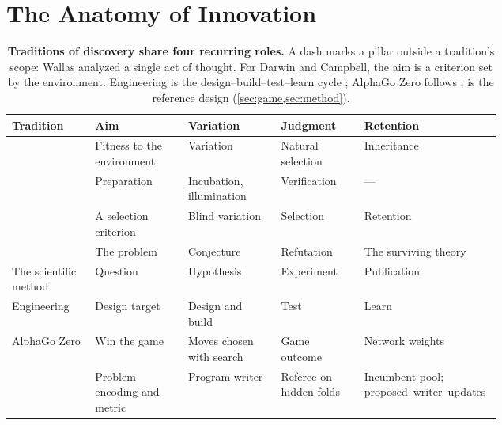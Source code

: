 \section{The Anatomy of Innovation}\label{sec:anatomy}
\begin{table}[t]
  \caption{\textbf{Traditions of discovery share four recurring roles.} A dash marks a pillar outside a tradition's scope: Wallas analyzed a single act of thought. For Darwin and Campbell, the aim is a criterion set by the environment. Engineering is the design--build--test--learn cycle \citep{nielsen2016engineering}; AlphaGo Zero follows \citet{silver2017mastering}; \EZ{} is the reference design (\cref{sec:game,sec:method}).}
  \label{tab:pillars}
  \centering
  \small\setlength{\extrarowheight}{2pt}%
  \setlength{\tabcolsep}{4pt}
  \begin{tabularx}{\linewidth}{@{}>{\raggedright\arraybackslash}p{0.17\linewidth}>{\raggedright\arraybackslash}p{0.19\linewidth}>{\raggedright\arraybackslash}p{0.19\linewidth}>{\raggedright\arraybackslash}p{0.17\linewidth}>{\raggedright\arraybackslash}X@{}}
    \toprule
    Tradition & Aim & Variation & Judgment & Retention \\
    \midrule
    \citet{darwin1859origin} & Fitness to the environment & Variation & Natural selection & Inheritance \\
    \citet{wallas1926art} & Preparation & Incubation, illumination & Verification & --- \\
    \citet{campbell1960bvsr} & A selection criterion & Blind variation & Selection & Retention \\
    \citet{popper1963conjectures} & The problem & Conjecture & Refutation & The surviving theory \\
    The scientific method & Question & Hypothesis & Experiment & Publication \\
    Engineering & Design target & Design and build & Test & Learn \\
    AlphaGo Zero & Win the game & Moves chosen with search & Game outcome & Network weights \\
    \midrule
    \EZ{} & Problem encoding and metric & Program writer & Referee on hidden folds & Incumbent pool; \mbox{proposed writer updates} \\
    \bottomrule
  \end{tabularx}
\end{table}

